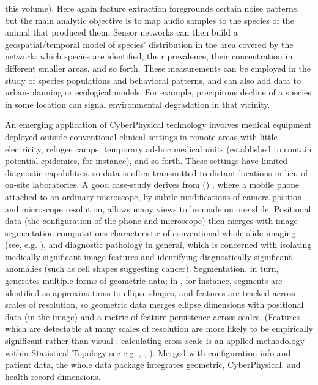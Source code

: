 {\begin{description}
this volume).  Here again feature 
extraction foregrounds certain noise patterns, but the 
main analytic objective is to map audio samples to 
the species of the animal that produced them.  
Sensor networks can then build a geospatial/temporal 
model of species' distribution in the area covered by 
the network: which species are identified, their prevalence, 
their concentration in different smaller areas, and so forth.  
These measurements can be employed in the study of 
species populations and behavioral patterns, and can 
also add data to urban-planning or ecological models.  
For example, precipitous decline of a species in some 
location can signal environmental degradation in that vicinity.   
\item[Remote Medical Diagnosis]  An emerging application of 
CyberPhysical technology involves medical equipment 
deployed outside conventional clinical settings 
\mdash{} in remote areas with little electricity, refugee 
camps, temporary ad-hoc medical units (established 
to contain potential epidemics, for instance), and 
so forth.  These settings have limited diagnostic 
capabilities, so data is often transmitted to distant 
locations in lieu of on-site laboratories.  A 
good case-study derives from  
(\mWSI{}) \cite{Auguste}, where a mobile 
phone attached to an ordinary microscope, 
by subtle modifications of camera position and microscope 
resolution, allows many views to be made on one slide.  
Positional data (the configuration of the phone and microscope) 
then merges with image segmentation 
computations characteristic of 
conventional whole slide imaging (see, e.g. \cite{Farahani}), 
and diagnostic pathology 
in general, which 
is concerned with isolating medically significant image 
features and identifying diagnostically significant 
anomalies (such as cell shapes 
suggesting cancer).  Segmentation, in turn, 
generates multiple forms of geometric data; in 
\cite{KaleAksoy}, for instance, segments are 
identified as approximations to ellipse shapes, 
and features are tracked across scales of resolution, 
so geometric data merges ellipse dimensions with 
positional data (in the image) and a metric 
of feature persistence across scales.  
(Features which are detectable at many scales of 
resolution are more likely to be empirically 
significant rather than visual ; calculating 
cross-scale  is an applied 
methodology within Statistical Topology \mdash{} 
see e.g. \cite{HaneyMaxwell}, 
\cite{EdelsbrunnerHarer}, \cite{HarryStrange}).  
Merged with \mWSI{} configuration info and patient data, the 
whole data package integrates geometric, CyberPhysical, 
and health-record dimensions. 
  

\end{description}}
